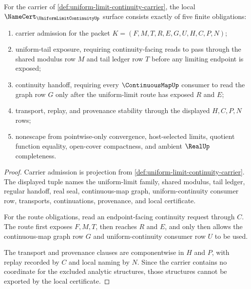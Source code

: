 \begin{theorem}
\label{thm:uniform-limit-continuity-namecert-obligations}
For the carrier of \autoref{def:uniform-limit-continuity-carrier}, the local $\NameCert_{\UniformLimitContinuityUp}$ surface consists exactly of five finite obligations:
\begin{enumerate}
\item carrier admission for the packet $K=(F,M,T,R,E,G,U,H,C,P,N)$;
\item uniform-tail exposure, requiring continuity-facing reads to pass through the shared modulus row $M$ and tail ledger row $T$ before any limiting endpoint is exposed;
\item continuity handoff, requiring every $\ContinuousMapUp$ consumer to read the graph row $G$ only after the uniform-limit route has exposed $R$ and $E$;
\item transport, replay, and provenance stability through the displayed $H,C,P,N$ rows;
\item nonescape from pointwise-only convergence, host-selected limits, quotient function equality, open-cover compactness, and ambient $\RealUp$ completeness.
\end{enumerate}
\end{theorem}
\begin{proof}
Carrier admission is projection from \autoref{def:uniform-limit-continuity-carrier}. The displayed tuple names the uniform-limit family, shared modulus, tail ledger, regular handoff, real seal, continuous-map graph, uniform-continuity consumer row, transports, continuations, provenance, and local certificate.

For the route obligations, read an endpoint-facing continuity request through $C$. The route first exposes $F,M,T$, then reaches $R$ and $E$, and only then allows the continuous-map graph row $G$ and uniform-continuity consumer row $U$ to be used.

The transport and provenance clauses are componentwise in $H$ and $P$, with replay recorded by $C$ and local naming by $N$. Since the carrier contains no coordinate for the excluded analytic structures, those structures cannot be exported by the local certificate.
\end{proof}

